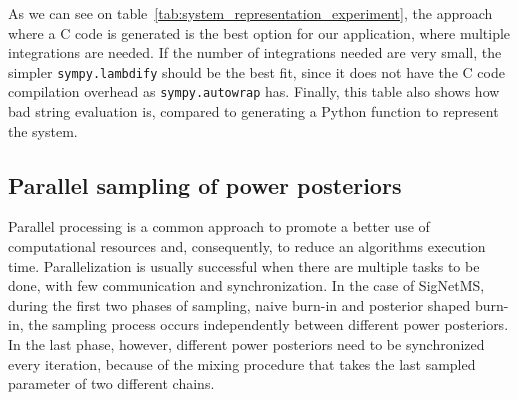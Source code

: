 As we can see on table~\ref{tab:system_representation_experiment}, the
approach where a C code is generated  is the best option for our 
application, where multiple integrations are needed. If the number of 
integrations needed are very small, the simpler {\tt sympy.lambdify} 
should be the best fit, since it does not have the C code compilation 
overhead as {\tt sympy.autowrap} has. Finally, this table also shows how
bad string evaluation is, compared to generating a Python function to
represent the system. 

\subsection{Parallel sampling of power posteriors}
Parallel processing is a common approach to promote a better use of
computational resources and, consequently, to reduce an algorithms
execution time. Parallelization is usually successful when there are
multiple tasks to be done, with few communication and synchronization.
In the case of SigNetMS, during the first two phases of sampling, naive
burn-in and posterior shaped burn-in, the sampling process occurs
independently between different power posteriors. In the last phase,
however, different power posteriors need to be synchronized every
iteration, because of the mixing procedure that takes the last sampled
parameter of two different chains. 

%

